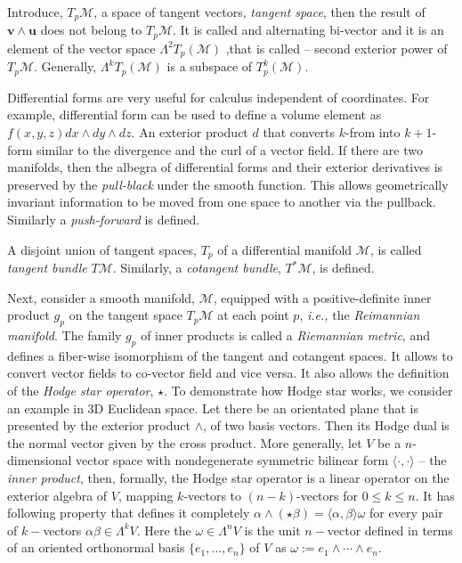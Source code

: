 \documentclass[11pt,a4paper,headinclude=true,DIV=14,BCOR=8mm,chapterprefix,listof=totoc,twoside,openright,abstracton]{scrbook}
\begin{document}
Introduce, $T_p \mathcal{M}$, a space of tangent vectors, \textit{tangent space}, then the result of $\boldsymbol{v}\wedge\boldsymbol{u}$ does not belong to $T_p \mathcal{M}$. It is called and alternating bi-vector and it is an element of the vector space $\Lambda^2 T_p (\mathcal{M})$ ,that is called -- second exterior power of $T_p \mathcal{M}$. Generally, $\Lambda^k T_p (\mathcal{M})$ is a subspace of $T_p ^k (\mathcal{M})$. 

Differential forms are very useful for calculus independent of coordinates. For example, differential form can be used to define a volume element as $f(x,y,z)dx \wedge dy \wedge dz$. An exterior product $d$ that converts $k$-from into $k+1$-form similar to the divergence and the curl of a vector field. If there are two manifolds, then the albegra of differential forms and their exterior derivatives is preserved by the \textit{pull-black} under the smooth function. This allows geometrically invariant information to be moved from one space to another via the pullback. Similarly a \textit{push-forward} is defined.

A disjoint union of tangent spaces, $T_p$ of a differential manifold $\mathcal{M}$, is called \textit{tangent bundle} $T\mathcal{M}$. Similarly, a \textit{cotangent bundle}, $T^*\mathcal{M}$, is defined. 

Next, consider a smooth manifold, $\mathcal{M}$, equipped with a positive-definite inner product $g_p$ on the tangent space $T_p \mathcal{M}$ at each point $p$, \textit{i.e.,} the \textit{Reimannian manifold}. The family $g_p$ of inner products is called a \textit{Riemannian metric}, and defines a fiber-wise isomorphism of the tangent and cotangent spaces. It allows to convert vector fields to co-vector field and vice versa. It also allows the definition of the \textit{Hodge star operator}, $\star$. To demonstrate how Hodge star works, we consider an example in 3D Euclidean space. Let there be an orientated plane that is presented by the exterior product $\wedge$, of two basis vectors. Then its Hodge dual is the normal vector given by the cross product. 
More generally, let $V$ be a $n$-dimensional vector space with nondegenerate symmetric bilinear form $\langle\cdot,\cdot\rangle$ -- the \textit{inner product}, then, formally, the Hodge star operator is a linear operator on the exterior algebra of $V$, mapping $k$-vectors to $(n-k)$-vectors for $0\leq k \leq n$. It has following property that defines it completely 
$\alpha\wedge(\star\beta) = \langle\alpha,\beta\rangle\omega$ for every pair of $k-$vectors $\alpha\beta\in\Lambda^kV$. 
Here the $\omega\in\Lambda^n V$ is the unit $n-$vector defined in terms of an oriented orthonormal basis $\{e_1,...,e_n\}$ of $V$ as $\omega := e_1 \wedge \cdots \wedge e_n$. 
\end{document}
